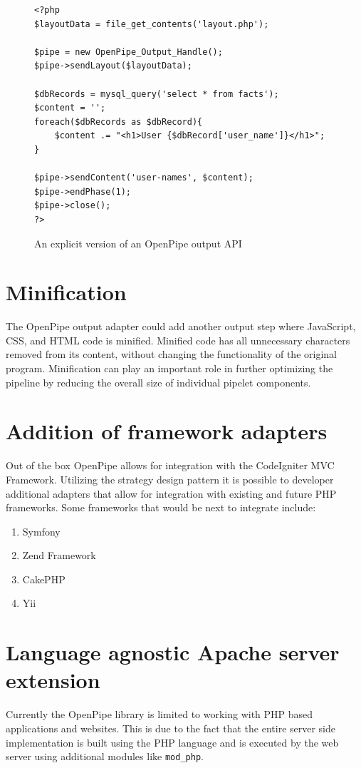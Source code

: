 \documentclass[12pt]{report}
\begin{document}
\begin{figure}[H]
\begin{lstlisting}
<?php
$layoutData = file_get_contents('layout.php');

$pipe = new OpenPipe_Output_Handle();
$pipe->sendLayout($layoutData);

$dbRecords = mysql_query('select * from facts');
$content = '';
foreach($dbRecords as $dbRecord){
	$content .= "<h1>User {$dbRecord['user_name']}</h1>";
}

$pipe->sendContent('user-names', $content);
$pipe->endPhase(1);
$pipe->close();
?>
\end{lstlisting}
\caption{An explicit version of an OpenPipe output API}
\label{fig:explicitApi}
\end{figure}

\section{Minification}
The OpenPipe output adapter could add another output step where JavaScript, CSS, and HTML code is minified. Minified code has all unnecessary characters removed from its content, without changing the functionality of the original program. Minification can play an important role in further optimizing the pipeline by reducing the overall size of individual pipelet components.

\section{Addition of framework adapters}
Out of the box OpenPipe allows for integration with the CodeIgniter MVC Framework. Utilizing the strategy design pattern it is possible to developer additional adapters that allow for integration with existing and future PHP frameworks. Some frameworks that would be next to integrate include:

\begin{enumerate}
	\item Symfony
	\item Zend Framework
	\item CakePHP
	\item Yii
\end{enumerate}

\section{Language agnostic Apache server extension}
Currently the OpenPipe library is limited to working with PHP based applications and websites. This is due to the fact that the entire server side implementation is built  using the PHP language and is executed by the web server using additional modules like \texttt{mod\_php}. 
\end{document}
